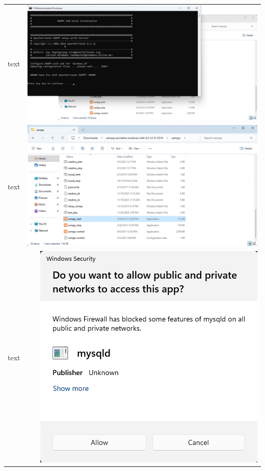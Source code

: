 \documentclass[11pt,a4paper]{report}
\begin{document}
\begin{tabular}{ l r }
            text & \includegraphics[scale=1.0]{xampp09} \\
            text & \includegraphics[scale=1.0]{xampp10} \\
            text & \includegraphics[scale=1.0]{xampp11} \\

\end{tabular}
\end{document}
